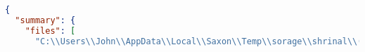 \begin{lstlisting}[language=json,label=lst:example_report_adv, caption=Modified report entries]
{
  "summary": {
    "files": [
      "C:\\Users\\John\\AppData\\Local\\Saxon\\Temp\\sorage\\shrinal\\(*@\linebreak@*)podostemad\\hired\\oxyphenyl\\demonocracy\\Lapsana\\Kamasin\\(*@\linebreak@*)menoschesis\\spinnerular\\symptomless\\unknelled\\Cladocera\\lame\\(*@\linebreak@*)suspensively\\uncomparably\\Utopianize\\demigroat\\ovistic\\equalize\\(*@\linebreak@*)lounger\\staghunt\\Cascadia\\head\\overrule\\chichimecan\\(*@\linebreak@*)Edestosaurus\\berrigan\\booger\\cinurous\\unhurt\\gollar\\uraniid\\(*@\linebreak@*)blousing\\lunge\\recrease\\rage\\limy\\predefense\\spadger\\(*@\linebreak@*)Wykehamist\\taxidermist\\outcrier\\patchwork\\specular\\huffish
\end{lstlisting}
